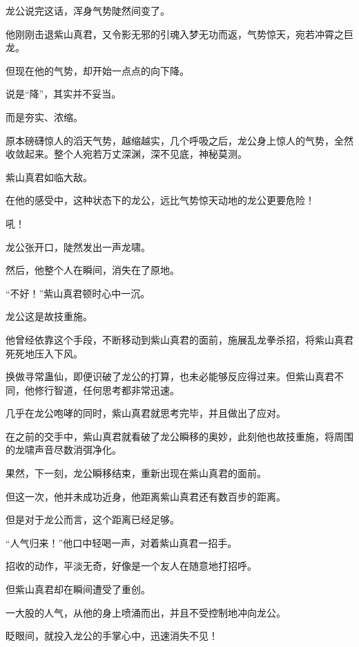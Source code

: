 
\begin{this_body}



龙公说完这话，浑身气势陡然间变了。

他刚刚击退紫山真君，又令影无邪的引魂入梦无功而返，气势惊天，宛若冲霄之巨龙。

但现在他的气势，却开始一点点的向下降。

说是“降”，其实并不妥当。

而是夯实、浓缩。

原本磅礴惊人的滔天气势，越缩越实，几个呼吸之后，龙公身上惊人的气势，全然收敛起来。整个人宛若万丈深渊，深不见底，神秘莫测。

紫山真君如临大敌。

在他的感受中，这种状态下的龙公，远比气势惊天动地的龙公更要危险！

吼！

龙公张开口，陡然发出一声龙啸。

然后，他整个人在瞬间，消失在了原地。

“不好！”紫山真君顿时心中一沉。

龙公这是故技重施。

他曾经依靠这个手段，不断移动到紫山真君的面前，施展乱龙拳杀招，将紫山真君死死地压入下风。

换做寻常蛊仙，即便识破了龙公的打算，也未必能够反应得过来。但紫山真君不同，他修行智道，任何思考都非常迅速。

几乎在龙公咆哮的同时，紫山真君就思考完毕，并且做出了应对。

在之前的交手中，紫山真君就看破了龙公瞬移的奥妙，此刻他也故技重施，将周围的龙啸声音尽数消弭净化。

果然，下一刻，龙公瞬移结束，重新出现在紫山真君的面前。

但这一次，他并未成功近身，他距离紫山真君还有数百步的距离。

但是对于龙公而言，这个距离已经足够。

“人气归来！”他口中轻喝一声，对着紫山真君一招手。

招收的动作，平淡无奇，好像是一个友人在随意地打招呼。

但紫山真君却在瞬间遭受了重创。

一大股的人气，从他的身上喷涌而出，并且不受控制地冲向龙公。

眨眼间，就投入龙公的手掌心中，迅速消失不见！


\end{this_body}
